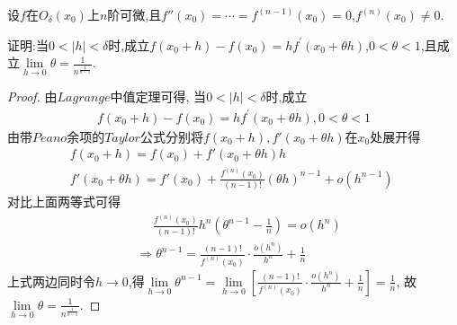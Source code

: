 \documentclass[lang=cn,newtx,10pt,scheme=chinese]{../Template/elegantbook}
\begin{document}
\begin{exercise}
    设\(f\)在\(O_{\delta}(x_0)\)上\(n\)阶可微,且\(f''(x_0)=\cdots =f^{(n - 1)}(x_0)=0\),\(f^{(n)}(x_0)\neq0\).
    
    证明:当\(0<|h|<\delta\)时,成立\(f(x_0 + h)-f(x_0)=hf^{\prime}(x_0+\theta h)\),\(0<\theta<1\),且成立$\lim\limits_{h\to0}\theta=\frac{1}{n^{\frac{1}{n - 1}}}$.
\end{exercise}
    \begin{proof}
        由$Lagrange$中值定理可得,
        当\(0<|h|<\delta\)时,成立
        \begin{gather}
            f(x_0 + h)-f(x_0)=hf^{\prime}(x_0+\theta h),0<\theta<1
            \nonumber
        \end{gather}
        由带$Peano$余项的$Taylor$公式分别将$f\left( x_0+h \right),f'\left( x_0+\theta h \right)$在$x_0$处展开得
        \begin{gather}
            f\left( x_0+h \right) =f\left( x_0 \right) +f'\left( x_0+\theta h \right) h
            \nonumber\\
            f'\left( x_0+\theta h \right) =f'\left( x_0 \right) +\frac{f^{\left( n \right)}\left( x_0 \right)}{\left( n-1 \right) !}\left( \theta h \right) ^{n-1}+o\left( h^{n-1} \right) \,\,
            \nonumber
        \end{gather}
        对比上面两等式可得
        \begin{equation}
            \begin{split}
                &\,\,\,\,\,\,\,\,\frac{f^{\left( n \right)}\left( x_0 \right)}{\left( n-1 \right) !}h^n\left( \theta ^{n-1}-\frac{1}{n} \right) =o\left( h^n \right) 
                \\
                &\Rightarrow \theta ^{n-1}=\frac{\left( n-1 \right) !}{f^{\left( n \right)}\left( x_0 \right)}\cdot \frac{o\left( h^n \right)}{h^n}+\frac{1}{n}    
            \end{split}
            \nonumber
        \end{equation}
        上式两边同时令$h\to0$,得$\underset{h\rightarrow 0}{\lim}\theta ^{n-1}=\underset{h\rightarrow 0}{\lim}\left[ \frac{\left( n-1 \right) !}{f^{\left( n \right)}\left( x_0 \right)}\cdot \frac{o\left( h^n \right)}{h^n}+\frac{1}{n} \right] =\frac{1}{n}$,
        故$\underset{h\rightarrow 0}{\lim}\theta =\frac{1}{n^{\frac{1}{n-1}}}$.
    
\end{proof}
\end{document}
